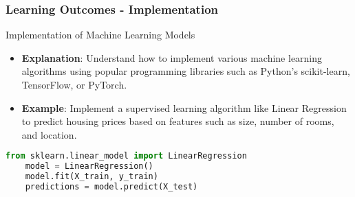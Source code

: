 \documentclass[aspectratio=169]{beamer}
\begin{document}
\begin{frame}[fragile]
    \frametitle{Learning Outcomes - Implementation}
    \begin{block}{Implementation of Machine Learning Models}
        \begin{itemize}
            \item \textbf{Explanation}: Understand how to implement various machine learning algorithms using popular programming libraries such as Python's scikit-learn, TensorFlow, or PyTorch.
            \item \textbf{Example}: Implement a supervised learning algorithm like Linear Regression to predict housing prices based on features such as size, number of rooms, and location.
        \end{itemize}
    \end{block}
    
    \begin{lstlisting}[language=Python]
    from sklearn.linear_model import LinearRegression
    model = LinearRegression()
    model.fit(X_train, y_train)
    predictions = model.predict(X_test)
    \end{lstlisting}
\end{frame}
\end{document}
